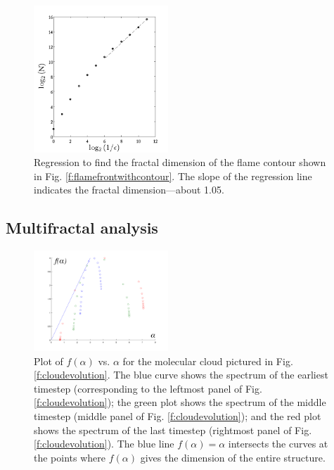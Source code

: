 \documentclass{emulateapj}
\begin{document}
\begin{figure}[ht]
	\begin{center}
	\includegraphics[width=0.45\textwidth,clip=true]{Graphics/logNvsE.png}
	\caption{Regression to find the fractal dimension of the flame contour shown in Fig. \ref{f:flamefrontwithcontour}. The slope of the regression line indicates the fractal dimension—about 1.05.
	\label{f:logNvsE}}
	\end{center}
	\end{figure} 


\subsection{Multifractal analysis}\label{MultifractalResults}

\begin{figure}[ht]
	\begin{center}
	\includegraphics[width=0.45\textwidth,clip=true]{Graphics/falphaclouds.png}
	\caption{Plot of $f(\alpha)$ vs. $\alpha$ for the molecular cloud pictured in Fig. \ref{f:cloudevolution}. The blue curve shows the spectrum of the earliest timestep (corresponding to the leftmost panel of Fig. \ref{f:cloudevolution}); the green plot shows the spectrum of the middle timestep (middle panel of Fig. \ref{f:cloudevolution}); and the red plot shows the spectrum of the last timestep (rightmost panel of Fig. \ref{f:cloudevolution}). The blue line $f(\alpha) = \alpha $ intersects the curves at the points where $f(\alpha)$ gives the dimension of the entire structure.
	\label{f:falphamultifractal}}
	\end{center}
	\end{figure} 
\end{document}
